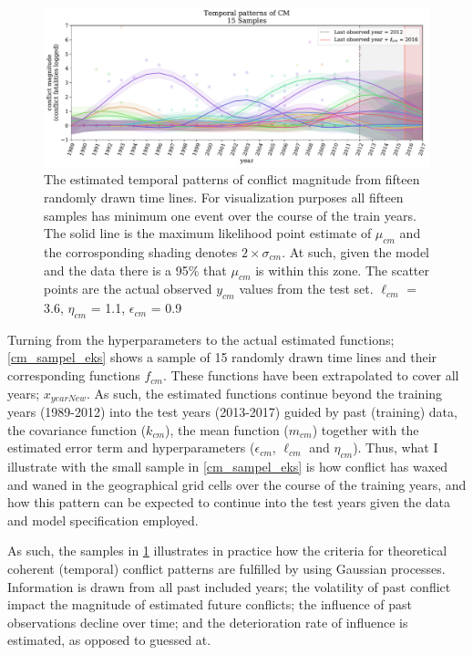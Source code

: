 \documentclass[a4paper]{article}
\begin{document}
\begin{figure}[!htb]
	\centering
	\includegraphics[scale=0.47]{cm_15_samples.pdf}
    \caption{\footnotesize{The estimated temporal patterns of conflict magnitude from fifteen randomly drawn time lines. For visualization purposes all fifteen samples has minimum one event over the course of the train years. The solid line is the maximum likelihood point estimate of $\mu_{cm}$ and the corrosponding shading denotes $2\times\sigma_{cm}$. At such, given the model and the data there is a 95\% that $\mu_{cm}$ is within this zone. The scatter points are the actual observed $y_{cm}$ values from the test set. $\ell_{cm}$ = 3.6, $\eta_{cm}$ = 1.1, $\epsilon_{cm}$ = 0.9}\label{cm_sampel_eks}}
\end{figure}

Turning from the hyperparameters to the actual estimated functions; \autoref{cm_sampel_eks} shows a sample of 15 randomly drawn time lines and their corresponding functions $f_{cm}$. These functions have been extrapolated to cover all years; $x_{yearNew}$. As such, the estimated functions continue beyond the training years (1989-2012) into the test years (2013-2017) guided by past (training) data, the covariance function ($k_{cm}$), the mean function ($m_{cm}$) together with the estimated error term and hyperparameters ($\epsilon_{cm}$, $\ell_{cm}$ and $\eta_{cm}$). Thus, what I illustrate with the small sample in \autoref{cm_sampel_eks} is how conflict has waxed and waned in the geographical grid cells over the course of the training years, and how this pattern can be expected to continue into the test years given the data and model specification employed.\par 

As such, the samples in \ref{cm_sampel_eks} illustrates in practice how the criteria for theoretical coherent (temporal) conflict patterns are fulfilled by using Gaussian processes. Information is drawn from all past included years; the volatility of past conflict impact the magnitude of estimated future conflicts; the influence of past observations decline over time; and the deterioration rate of influence is estimated, as opposed to guessed at.\par
\end{document}
